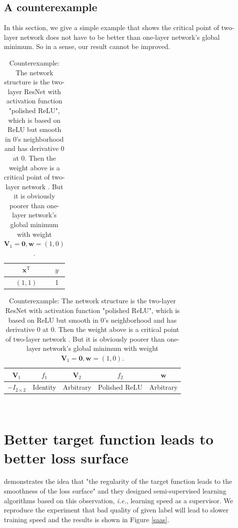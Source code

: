 \documentclass{article}
\theoremstyle{plain}
\theoremstyle{definition}
\begin{document}
\subsection{A counterexample}
In this section, we give a simple example that shows the critical point of two-layer network does not have to be better 
than one-layer network's global minimum. So in a sense, our result cannot be improved.

\begin{table}[H]
\begin{minipage}[t]{0.3\linewidth}
\centering
\begin{tabular}{|c|c|}
\hline $\mathbf x^\mathrm{T}$&$y$\\
\hline $(1,1)$&1\\
\hline
\end{tabular}
\end{minipage}
\begin{minipage}[t]{0.5\linewidth}
\centering
\begin{tabular}{|c|c|c|c|c|}
\hline $\mathbf V_1$&$f_1$&$\mathbf V_2$&$f_2$&$\mathbf w$\\
\hline $-I_{2\times 2}$&Identity&Arbitrary&Polished ReLU&Arbitrary\\
\hline
\end{tabular}
\end{minipage}
\\
\caption{Counterexample: The network structure is the two-layer ResNet with activation function "polished ReLU",
which is based on ReLU but smooth in 0's neighborhood and has derivative 0 at 0. Then the weight above is a critical point of two-layer network . But it is obviously poorer than one-layer network's global minimum with weight $\mathbf V_1=\mathbf 0, \mathbf w=(1,0)$.}
\end{table}


\section{Better target function leads to better loss surface}

\cite{cicek2018saas,cicek2018input} demonstrates the idea that "the regularity of the target function leads to the smoothness of the loss surface" and they designed semi-supervised learning algorithms based on this observation, \emph{i.e.}, learning speed as a supervisor. We reproduce the experiment that bad quality of given label will lead to slower training speed and the results is shown in Figure \ref{saas}.
\end{document}
